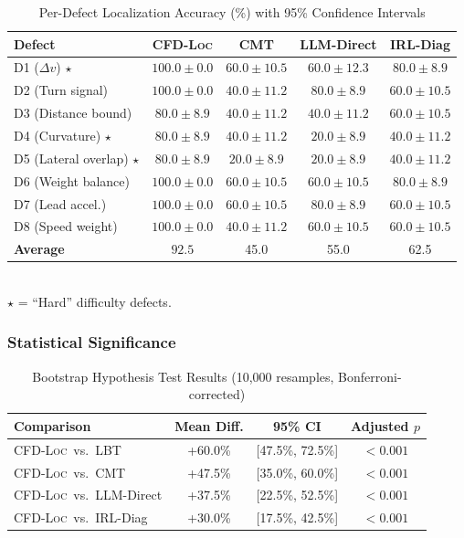 \documentclass[journal]{IEEEtran}
\theoremstyle{plain}
\theoremstyle{definition}
\theoremstyle{remark}
\newcommand{\methodname}{\textsc{CFD-Loc}}
\begin{document}
\begin{table}[t]
\centering
\caption{Per-Defect Localization Accuracy (\%) with 95\% Confidence Intervals}
\label{tab:per_defect}
\small
\begin{tabular}{lcccc}
\toprule
\textbf{Defect} & \textbf{\methodname} & \textbf{CMT} & \textbf{LLM-Direct} & \textbf{IRL-Diag} \\\midrule
D1 ($\Delta v$) $\star$ & $100.0 \pm 0.0$ & $60.0 \pm 10.5$ & $60.0 \pm 12.3$ & $80.0 \pm 8.9$\\
D2 (Turn signal) & $100.0 \pm 0.0$ & $40.0 \pm 11.2$ & $80.0 \pm 8.9$ & $60.0 \pm 10.5$\\
D3 (Distance bound) & $80.0 \pm 8.9$ & $40.0 \pm 11.2$ & $40.0 \pm 11.2$ & $60.0 \pm 10.5$\\
D4 (Curvature) $\star$ & $80.0 \pm 8.9$ & $40.0 \pm 11.2$ & $20.0 \pm 8.9$ & $40.0 \pm 11.2$\\
D5 (Lateral overlap) $\star$ & $80.0 \pm 8.9$ & $20.0 \pm 8.9$ & $20.0 \pm 8.9$ & $40.0 \pm 11.2$\\
D6 (Weight balance) & $100.0 \pm 0.0$ & $60.0 \pm 10.5$ & $60.0 \pm 10.5$ & $80.0 \pm 8.9$\\
D7 (Lead accel.) & $100.0 \pm 0.0$ & $60.0 \pm 10.5$ & $80.0 \pm 8.9$ & $60.0 \pm 10.5$\\
D8 (Speed weight) & $100.0 \pm 0.0$ & $40.0 \pm 11.2$ & $60.0 \pm 10.5$ & $60.0 \pm 10.5$\\
\midrule
\textbf{Average} & $\mathbf{92.5}$ & 45.0 & 55.0 & 62.5\\
\bottomrule
\end{tabular}
\\[2pt]
\noindent\small $\star$ = ``Hard'' difficulty defects.
\end{table}

\subsubsection{Statistical Significance}

\begin{table}[t]
\centering
\caption{Bootstrap Hypothesis Test Results (10,000 resamples, Bonferroni-corrected)}
\label{tab:stats}
\small
\begin{tabular}{lccc}
\toprule
\textbf{Comparison} & \textbf{Mean Diff.} & \textbf{95\% CI} & \textbf{Adjusted $p$} \\\midrule
\methodname\ vs.\ LBT & +60.0\% & [47.5\%, 72.5\%] & $<0.001$\\
\methodname\ vs.\ CMT & +47.5\% & [35.0\%, 60.0\%] & $<0.001$\\
\methodname\ vs.\ LLM-Direct & +37.5\% & [22.5\%, 52.5\%] & $<0.001$\\
\methodname\ vs.\ IRL-Diag & +30.0\% & [17.5\%, 42.5\%] & $<0.001$\\
\bottomrule
\end{tabular}
\end{table}
\end{document}
